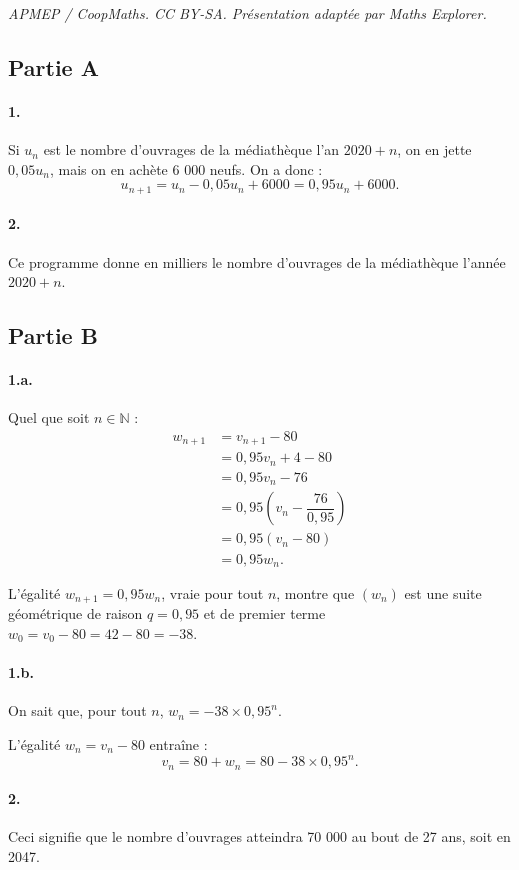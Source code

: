 \documentclass[10pt]{article}
\begin{document}
\noindent\textit{APMEP / CoopMaths. CC BY-SA. Présentation adaptée par Maths Explorer.}\par\medskip
\subsection*{Partie A}

\paragraph{1.} Si \( u_n \) est le nombre d'ouvrages de la médiathèque l'an \( 2020 + n \), on en jette \( 0{,}05u_n \), mais on en achète 6 000 neufs. On a donc :
\[
u_{n+1} = u_n - 0{,}05u_n + 6000 = 0{,}95u_n + 6000.
\]

\paragraph{2.} Ce programme donne en milliers le nombre d'ouvrages de la médiathèque l'année \( 2020 + n \).

\subsection*{Partie B}

\paragraph{1.a.} Quel que soit \( n \in \mathbb{N} \) :
\begin{align*}
w_{n+1} &= v_{n+1} - 80 \\
&= 0{,}95 v_n + 4 - 80 \\
&= 0{,}95 v_n - 76 \\
&= 0{,}95 \left(v_n - \dfrac{76}{0{,}95}\right) \\
&= 0{,}95(v_n - 80) \\
&= 0{,}95w_n.
\end{align*}

L'égalité \( w_{n+1} = 0{,}95w_n \), vraie pour tout \( n \), montre que \( (w_n) \) est une suite géométrique de raison \( q = 0{,}95 \) et de premier terme \( w_0 = v_0 - 80 = 42 - 80 = -38 \).

\paragraph{1.b.} On sait que, pour tout \( n \), \( w_n = -38 \times 0{,}95^n \).

L'égalité \( w_n = v_n - 80 \) entraîne :
\[
v_n = 80 + w_n = 80 - 38 \times 0{,}95^n.
\]

\paragraph{2.} Ceci signifie que le nombre d'ouvrages atteindra 70 000 au bout de 27 ans, soit en 2047.
\end{document}
